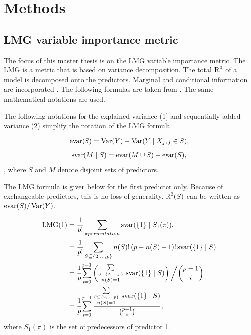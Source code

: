 \documentclass[11pt,a4paper,twoside]{book}\usepackage[]{graphicx}\usepackage[]{color}
\begin{document}








\chapter{Methods} 

\section{LMG variable importance metric}

The focus of this master thesis is on the LMG variable importance metric. The LMG is a metric that is based on variance decomposition. The total $\text{R}^2$ of a model is decomposed onto the predictors. Marginal and conditional information are incorporated \citep{Gromping2015} .  The following formulas are taken from \cite{Gromping2015}. The same mathematical notations are used. 

The following  notations for the explained variance (1) and sequentially added variance (2) simplify the notation of the LMG formula. 

   \begin{align} 
     \text{evar}(S) = \operatorname{Var}(Y) - \operatorname{Var}( Y \mid X_{j}, j \in S),   \label{eq:1} 
   \end{align} 
   \begin{align} 
     \text{svar}(M \mid S) = \text{evar}(M \cup S) - \text{evar}(S), \label{eq:2} 
    \end{align} , where $S$ and $M$ denote disjoint sets of predictors.
    
   The LMG formula is given below for the first predictor only. Because of exchangeable predictors, this is no loss of generality.  $\text{R}^2(S)$ can be written as $\text{evar}(S)/\operatorname{Var}(Y).$ 

   \begin{align*} 
     \LMG(1) &= \frac{1}{p!} \sum_{\pi permutation}^{} \SVAR(\{1\} \mid S_{1}(\pi)),   \nonumber  \\
     &= \frac{1}{p!} \sum_{S \subseteq \{ 2, \dots, p \} }^{} n(S)! \, (p-n(S)-1)! \, \SVAR(\{1\} \mid S) \nonumber  \\
     &=  \cfrac{1}{p} \sum_{i=0}^{p-1} \left( \substack {\sum\limits_{ S \subseteq \{ 2, \dots, p \}}\\n(S)=1}^{} \ \SVAR(\{1\} \mid S)\right)\bigg/ \binom{p-1}{i}  \nonumber \\   
         &=  \cfrac{1}{p} \sum_{i=0}^{p-1} \frac{ \substack{\sum\limits_{ S \subseteq \{ 2, \dots, p \}}\\n(S)=1}^{} \ \SVAR(\{1\} \mid S)}{\binom{p-1}{i}}, \nonumber \\      
   \end{align*}
   where $S_{1}(\pi)$ is the set of predecessors of predictor 1.
   
\end{document}
